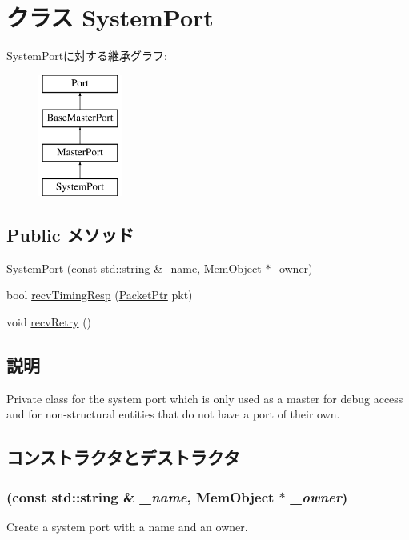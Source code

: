 \hypertarget{classSystem_1_1SystemPort}{
\section{クラス SystemPort}
\label{classSystem_1_1SystemPort}
}
SystemPortに対する継承グラフ:\begin{figure}[H]
\begin{center}
\leavevmode
\includegraphics[height=4cm]{classSystem_1_1SystemPort}
\end{center}
\end{figure}
\subsection*{Public メソッド}
\begin{DoxyCompactItemize}
\item 
\hyperlink{classSystem_1_1SystemPort_a2ca3577bc668ca868798f5771db85d03}{SystemPort} (const std::string \&\_\-name, \hyperlink{classMemObject_1_1MemObject}{MemObject} $\ast$\_\-owner)
\item 
bool \hyperlink{classSystem_1_1SystemPort_a482dba5588f4bee43e498875a61e5e0b}{recvTimingResp} (\hyperlink{classPacket}{PacketPtr} pkt)
\item 
void \hyperlink{classSystem_1_1SystemPort_a29cb5a4f98063ce6e9210eacbdb35298}{recvRetry} ()
\end{DoxyCompactItemize}


\subsection{説明}
Private class for the system port which is only used as a master for debug access and for non-\/structural entities that do not have a port of their own. 

\subsection{コンストラクタとデストラクタ}
\hypertarget{classSystem_1_1SystemPort_a2ca3577bc668ca868798f5771db85d03}{
\subsubsection[{SystemPort}]{ (const std::string \& {\em \_\-name}, \/  {\bf MemObject} $\ast$ {\em \_\-owner})}}
\label{classSystem_1_1SystemPort_a2ca3577bc668ca868798f5771db85d03}
Create a system port with a name and an owner. 



